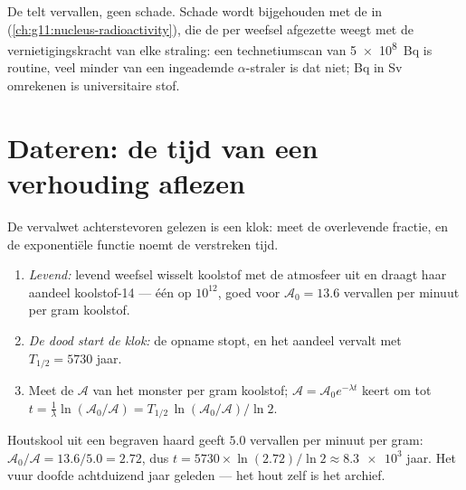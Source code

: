 \begin{remark}\label{rem:g12:radioactive-decay:dose}
De  telt vervallen, geen schade. Schade wordt bijgehouden met de
 in  (\cref{ch:g11:nucleus-radioactivity}), die de per 
weefsel afgezette  weegt met de vernietigingskracht van elke straling:
een technetiumscan van \qty{5e8}{Bq} is routine, veel minder  van een
ingeademde $\alpha$-straler is dat niet; \unit{Bq} in \unit{Sv} omrekenen is
universitaire stof.
\end{remark}

\section{Dateren: de tijd van een verhouding aflezen}

De vervalwet achterstevoren gelezen is een klok: meet de overlevende fractie,
en de exponentiële functie noemt de verstreken tijd.

\begin{method}[Koolstofdatering]\label{met:g12:radioactive-decay:carbon}
\begin{enumerate}
  \item \emph{Levend:} levend weefsel wisselt koolstof met de atmosfeer uit en
        draagt haar aandeel koolstof-14 --- één  op $10^{12}$, goed voor
        $\mathcal A_0 = 13.6$ vervallen per minuut per gram koolstof.
  \item \emph{De dood start de klok:} de opname stopt, en het aandeel vervalt
        met $T_{1/2} = \num{5730}$ jaar.
  \item Meet de  $\mathcal A$ van het monster per gram koolstof;
        $\mathcal A = \mathcal A_0 e^{-\lambda t}$ keert om tot
        $t = \frac{1}{\lambda}\ln(\mathcal A_0/\mathcal A)
        = T_{1/2}\,\ln(\mathcal A_0/\mathcal A)/\ln 2$.
\end{enumerate}
\end{method}

\begin{example}\label{ex:g12:radioactive-decay:hearth}
Houtskool uit een begraven haard geeft $5.0$ vervallen per minuut per gram:
$\mathcal A_0/\mathcal A = 13.6/5.0 = 2.72$, dus
$t = \num{5730} \times \ln(2.72)/\ln 2 \approx \num{8.3e3}$ jaar. Het vuur
doofde achtduizend jaar geleden --- het hout zelf is het archief.
\end{example}

